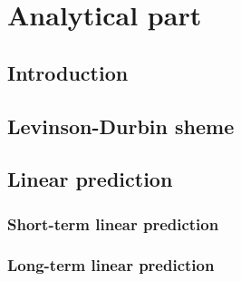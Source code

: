 
\chapter{Analytical part} \label{sec:analytical}

\section{Introduction} \label{sec:introduction}

\section{Levinson-Durbin sheme} \label{sec:levinson}

\section{Linear prediction} \label{sec:lp}

    \subsection{Short-term linear prediction} \label{sec:shortlp}

    \subsection{Long-term linear prediction} \label{sec:longlp}
